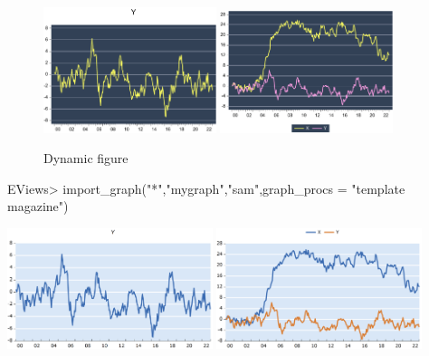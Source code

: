 \documentclass[
]{article}
\newenvironment{Shaded}{\begin{snugshade}}{\end{snugshade}}
\newcommand{\AttributeTok}[1]{\textcolor[rgb]{0.77,0.63,0.00}{#1}}
\newcommand{\FunctionTok}[1]{\textcolor[rgb]{0.00,0.00,0.00}{#1}}
\newcommand{\NormalTok}[1]{#1}
\newcommand{\SpecialCharTok}[1]{\textcolor[rgb]{0.00,0.00,0.00}{#1}}
\newcommand{\StringTok}[1]{\textcolor[rgb]{0.31,0.60,0.02}{#1}}
\begin{document}
\begin{figure}[h]

{\centering \includegraphics[width=0.45\textwidth]{test_engEviews_files/figure-latex//sagirumati-sam-eviewsr_graph} \includegraphics[width=0.45\textwidth]{test_engEviews_files/figure-latex//sagirumati-sam-graph1} 

}

\caption{Dynamic figure}\label{fig:sagirumati}
\end{figure}

\begin{Shaded}
\begin{Highlighting}[]
\NormalTok{EViews}\SpecialCharTok{\textgreater{}} \FunctionTok{import\_graph}\NormalTok{(}\StringTok{"*"}\NormalTok{,}\StringTok{"mygraph"}\NormalTok{,}\StringTok{"sam"}\NormalTok{,}\AttributeTok{graph\_procs =} \StringTok{"template magazine"}\NormalTok{)}
\end{Highlighting}
\end{Shaded}

\includegraphics[width=0.45\textwidth]{test_engEviews_files/figure-latex//grap-EVIEWSR_GRAPH} \includegraphics[width=0.45\textwidth]{test_engEviews_files/figure-latex//grap-GRAPH1}
\end{document}

